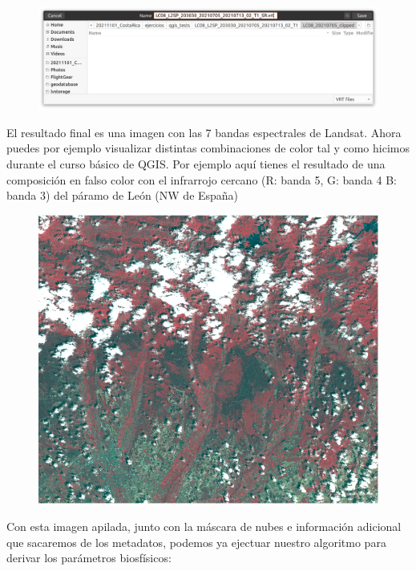 \documentclass[a4paper,11pt]{article}
\begin{document}
\begin{enumerate}
       \begin{figure}[H]\centering
        \includegraphics[width=\textwidth]{qgis_save_vrt}
       \end{figure} 
      \end{enumerate}

      El resultado final es una imagen con las 7 bandas espectrales de Landsat. Ahora puedes por ejemplo visualizar distintas combinaciones de color tal y como hicimos durante el curso básico de QGIS. Por ejemplo aquí tienes el resultado de una composición en falso color con el infrarrojo cercano (R: banda 5, G: banda 4 B: banda 3) del páramo de León (NW de España)
      
       \begin{figure}[H]\centering
        \includegraphics[width=\textwidth]{paramo_leon}
       \end{figure}
       
      Con esta imagen apilada, junto con la máscara de nubes e información adicional que sacaremos de los metadatos, podemos ya ejectuar nuestro algoritmo para derivar los parámetros biosfísicos:
      
\end{document}
